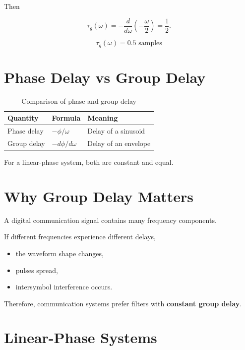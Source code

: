 Then

\[
\tau_g(\omega)=
-\frac{d}{d\omega}\left(-\frac{\omega}{2}\right)
=
\frac12.
\]

\[
\boxed{
\tau_g(\omega)=0.5\text{ samples}
}
\]


\section{Phase Delay vs Group Delay}

\begin{table}[H]
\centering
\caption{Comparison of phase and group delay}
\begin{tabular}{|p{5cm}|p{4cm}|p{4cm}|}
\hline
\textbf{Quantity} & \textbf{Formula} & \textbf{Meaning}\\
\hline
Phase delay & \(-\phi/\omega\) & Delay of a sinusoid\\
\hline
Group delay & \(-d\phi/d\omega\) & Delay of an envelope\\
\hline
\end{tabular}
\end{table}

For a linear-phase system, both are constant and equal.


\section{Why Group Delay Matters}

A digital communication signal contains many frequency components.

If different frequencies experience different delays,

\begin{itemize}
\item the waveform shape changes,
\item pulses spread,
\item intersymbol interference occurs.
\end{itemize}

Therefore, communication systems prefer filters with \textbf{constant group delay}.


\section{Linear-Phase Systems}

